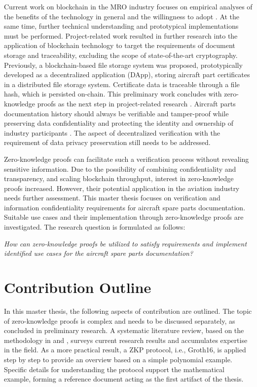Current work on blockchain in the MRO industry focuses on empirical analyses of the benefits of the technology in general and the willingness to adopt \citep{efthymiou}. At the same time, further technical understanding and prototypical implementations must be performed. Project-related work resulted in further research into the application of blockchain technology to target the requirements of document storage and traceability, excluding the scope of state-of-the-art cryptography. Previously, a blockchain-based file storage system was proposed, prototypically developed as a decentralized application (DApp), storing aircraft part certificates in a distributed file storage system. Certificate data is traceable through a file hash, which is persisted on-chain. This preliminary work concludes with zero-knowledge proofs as the next step in project-related research \citep{ZedelJ}. Aircraft parts documentation history should always be verifiable and tamper-proof while preserving data confidentiality and protecting the identity and ownership of industry participants \citep{Wickboldt2019BlockchainFW}. The aspect of decentralized verification with the requirement of data privacy preservation still needs to be addressed.

Zero-knowledge proofs can facilitate such a verification process without revealing sensitive information. Due to the possibility of combining confidentiality and transparency, and scaling blockchain throughput, interest in zero-knowledge proofs increased. However, their potential application in the aviation industry needs further assessment. This master thesis focuses on verification and information confidentiality requirements for aircraft spare parts documentation. Suitable use cases and their implementation through zero-knowledge proofs are investigated. The research question is formulated as follows:

\begin{center}
\textit{How can zero-knowledge proofs be utilized to satisfy requirements and implement identified use cases for the aircraft spare parts documentation?}  
\end{center}

\section{Contribution Outline}
In this master thesis, the following aspects of contribution are outlined. The topic of zero-knowledge proofs is complex and needs to be discussed separately, as concluded in preliminary research. A systematic literature review, based on the methodology in \citet{vomBrockeJan2019TDgs} and \citet{Webster2002AnalyzingTP}, surveys current research results and accumulates expertise in the field. As a more practical result, a ZKP protocol, i.e., Groth16, is applied step by step to provide an overview based on a simple polynomial example. Specific details for understanding the protocol support the mathematical example, forming a reference document acting as the first artifact of the thesis.

